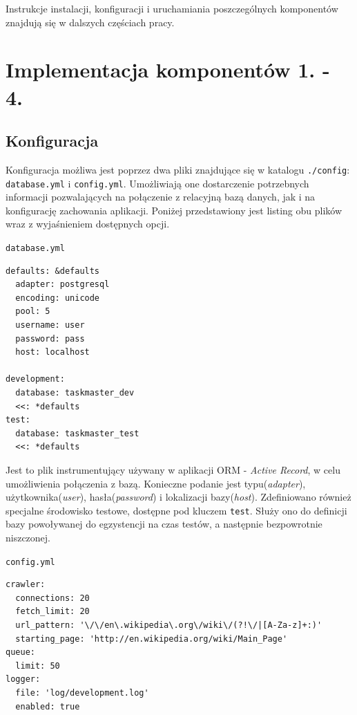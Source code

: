 Instrukcje instalacji, konfiguracji i uruchamiania poszczególnych komponentów znajdują się w dalszych częściach pracy.

\section{Implementacja komponentów 1. - 4.}

\subsection{Konfiguracja}
\label{subs:konfiguracjaMri}

Konfiguracja możliwa jest poprzez dwa pliki znajdujące się w katalogu \texttt{./config}: \texttt{database.yml} i \texttt{config.yml}. Umożliwiają one dostarczenie potrzebnych
informacji pozwalających na połączenie z relacyjną bazą danych, jak i na konfigurację zachowania aplikacji. Poniżej przedstawiony jest listing obu plików 
wraz z wyjaśnieniem dostępnych opcji.

\texttt{database.yml}

\begin{lstlisting}[frame=single]
defaults: &defaults
  adapter: postgresql
  encoding: unicode
  pool: 5
  username: user
  password: pass
  host: localhost

development:
  database: taskmaster_dev
  <<: *defaults
test:
  database: taskmaster_test
  <<: *defaults

\end{lstlisting}

Jest to plik instrumentujący używany w aplikacji ORM - \emph{Active Record}, w celu umożliwienia połączenia z bazą. Konieczne podanie jest typu(\emph{adapter}), 
użytkownika(\emph{user}), hasła(\emph{password}) i lokalizacji bazy(\emph{host}). Zdefiniowano również specjalne środowisko testowe, dostępne pod kluczem \texttt{test}.
Służy ono do definicji bazy powoływanej do egzystencji na czas testów, a następnie bezpowrotnie niszczonej. 
\newpage

\texttt{config.yml}

\lstset{language=ruby}
\begin{lstlisting}[frame=single]
crawler:
  connections: 20
  fetch_limit: 20
  url_pattern: '\/\/en\.wikipedia\.org\/wiki\/(?!\/|[A-Za-z]+:)'
  starting_page: 'http://en.wikipedia.org/wiki/Main_Page'
queue:
  limit: 50
logger:
  file: 'log/development.log'
  enabled: true

\end{lstlisting}

